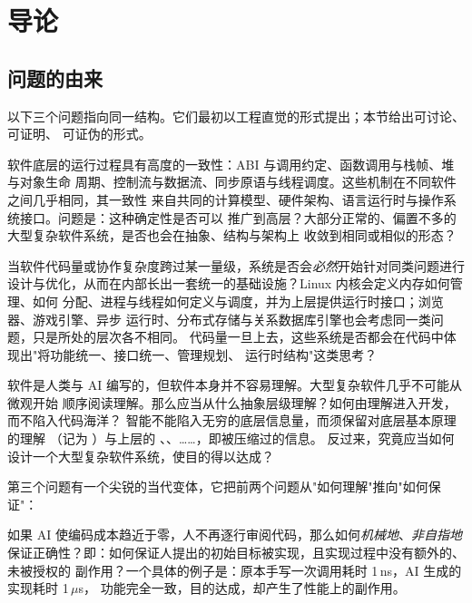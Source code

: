 \chapter{导论}

\section{问题的由来}

以下三个问题指向同一结构。它们最初以工程直觉的形式提出；本节给出可讨论、可证明、
可证伪的形式。

\begin{problem}[底层确定性的可推广性]\label{prob:low}
软件底层的运行过程具有高度的一致性：ABI 与调用约定、函数调用与栈帧、堆与对象生命
周期、控制流与数据流、同步原语与线程调度。这些机制在不同软件之间几乎相同，其一致性
来自共同的计算模型、硬件架构、语言运行时与操作系统接口。问题是：这种确定性是否可以
推广到高层？大部分正常的、偏置不多的大型复杂软件系统，是否也会在抽象、结构与架构上
收敛到相同或相似的形态？
\end{problem}

\begin{problem}[规模的强制性]\label{prob:scale}
当软件代码量或协作复杂度跨过某一量级，系统是否会\emph{必然}开始针对同类问题进行
设计与优化，从而在内部长出一套统一的基础设施？Linux 内核会定义内存如何管理、如何
分配、进程与线程如何定义与调度，并为上层提供运行时接口；浏览器、游戏引擎、异步
运行时、分布式存储与关系数据库引擎也会考虑同一类问题，只是所处的层次各不相同。
代码量一旦上去，这些系统是否都会在代码中体现出"将功能统一、接口统一、管理规划、
运行时结构"这类思考？
\end{problem}

\begin{problem}[智能的理解与设计]\label{prob:mind}
软件是人类与 AI 编写的，但软件本身并不容易理解。大型复杂软件几乎不可能从微观开始
顺序阅读理解。那么应当从什么抽象层级理解？如何由理解进入开发，而不陷入代码海洋？
智能不能陷入无穷的底层信息量，而须保留对底层基本原理的理解
（记为 ）与上层的 、、……，即被压缩过的信息。
反过来，究竟应当如何设计一个大型复杂软件系统，使目的得以达成？
\end{problem}

第三个问题有一个尖锐的当代变体，它把前两个问题从"如何理解"推向"如何保证"：

\begin{problem}[无人审阅条件下的正确性]\label{prob:trust}
如果 AI 使编码成本趋近于零，人不再逐行审阅代码，那么如何\emph{机械地}、\emph{非自指地}
保证正确性？即：如何保证人提出的初始目标被实现，且实现过程中没有额外的、未被授权的
副作用？一个具体的例子是：原本手写一次调用耗时 1\,ns，AI 生成的实现耗时 1\,$\mu$s，
功能完全一致，目的达成，却产生了性能上的副作用。
\end{problem}

